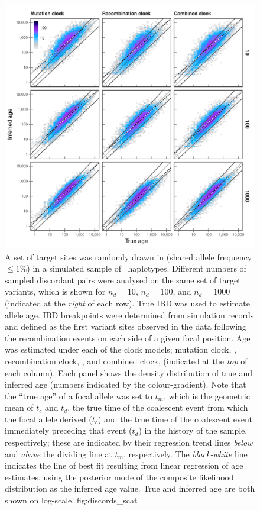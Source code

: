 

\begin{figure}[p]
\includegraphics[width=\textwidth]{./img/ch5/discords_scat}
{A set of  target sites was randomly drawn in \fk{[2,20]} (shared allele frequency ${\leq 1\%}$) in a simulated sample of ~haplotypes.
Different numbers of sampled discordant pairs were analysed on the same set of target variants, which is shown for ${n_d = \num{10}}$, ${n_d = \num{100}}$, and ${n_d = \num{1000}}$ (indicated at the \emph{right} of each row).
True IBD was used to estimate allele age.
IBD breakpoints were determined from simulation records and defined as the first variant sites observed in the data following the  recombination events on each side of a given focal position.
Age was estimated under each of the  clock models; \ie mutation clock, \ClockM, recombination clock, \ClockR, and combined clock, \ClockC (indicated at the \emph{top} of each column).
Each panel shows the density distribution of true and inferred age (numbers indicated by the colour-gradient).
Note that the ``true age'' of a focal allele was set to $t_m$, which is the geometric mean of $t_c$ and $t_d$, \ie the true time of the coalescent event from which the focal allele derived ($t_c$) and the true time of the coalescent event immediately preceding that event ($t_d$) in the history of the sample, respectively; these are indicated by their regression trend lines \emph{below} and \emph{above} the dividing line at $t_m$, respectively.
The \emph{black-white} line indicates the line of best fit resulting from linear regression of age estimates, using the posterior mode of the composite likelihood distribution as the inferred age value.
True and inferred age are both shown on log-scale.}
{fig:discords_scat}
\end{figure}
